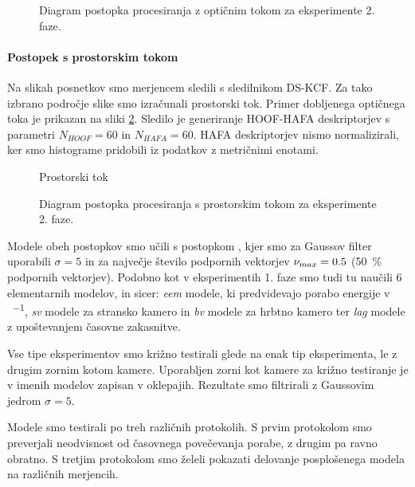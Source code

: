 \begin{figure}[htb]
	\centering
	
	\caption{Diagram postopka procesiranja z optičnim tokom za eksperimente 2. faze.}
	\label{fig:diagram-procesiranja-of-stage2}
\end{figure}

\paragraph{Postopek s prostorskim tokom}
Na slikah posnetkov smo merjencem sledili s sledilnikom DS-KCF. Za tako izbrano področje slike smo izračunali prostorski tok. Primer dobljenega optičnega toka je prikazan na sliki \ref{fig:prostorski-tok-stage2}. Sledilo je generiranje HOOF-HAFA deskriptorjev s parametri $N_{HOOF} = 60$ in $N_{HAFA} = 60$. HAFA deskriptorjev  nismo normalizirali, ker smo histograme pridobili iz podatkov z metričnimi enotami. 

\begin{figure}[htb]
	\centering
    \caption{Prostorski tok}
	\label{fig:prostorski-tok-stage2}
\end{figure}

\begin{figure}[htb]
	\centering
	
	\caption{Diagram postopka procesiranja s prostorskim tokom za eksperimente 2. faze.}
	\label{fig:diagram-procesiranja-sf-stage2}
\end{figure}
 
Modele obeh postopkov smo učili s postopkom \nurbf, kjer smo za Gaussov filter uporabili $\sigma=5$ in za največje število podpornih vektorjev $\nu_{max} =0.5$ (\SI{50}{\%} podpornih vektorjev). Podobno kot v eksperimentih 1. faze smo tudi tu naučili \num{6} elementarnih modelov, in sicer: \textit{eem} modele, ki predvidevajo porabo energije v \si{\kcal\per\min}, \textit{sv} modele za stransko kamero in \textit{bv} modele za hrbtno kamero ter \textit{lag} modele z upoštevanjem časovne zakasnitve.

Vse tipe eksperimentov smo križno testirali glede na enak tip eksperimenta, le z drugim zornim kotom kamere. Uporabljen zorni kot kamere za križno testiranje je v imenih modelov zapisan v oklepajih.  Rezultate smo filtrirali z Gaussovim jedrom $\sigma=5$. 

Modele smo testirali po treh različnih protokolih. S prvim protokolom smo preverjali neodvisnost od časovnega povečevanja porabe, z drugim pa ravno obratno. S tretjim protokolom smo želeli pokazati delovanje posplošenega modela na različnih merjencih.


